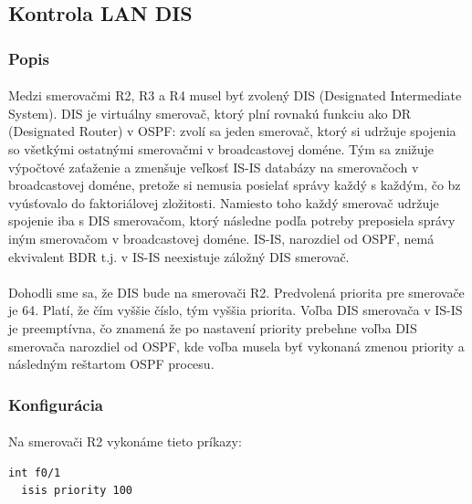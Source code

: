 \documentclass[12pt,twoside,a4paper]{report}
\begin{document}
\subsection{Kontrola LAN DIS}
\label{kontrola_lan_dis}
\subsubsection{Popis}
\paragraph{}
Medzi smerovačmi R2, R3 a R4 musel byť zvolený DIS (Designated Intermediate System). DIS je virtuálny smerovač, ktorý plní rovnakú funkciu ako DR (Designated Router) v OSPF: zvolí sa jeden smerovač, ktorý si udržuje spojenia so všetkými ostatnými smerovačmi v broadcastovej doméne. Tým sa znižuje výpočtové zaťaženie a zmenšuje veľkosť IS-IS databázy na smerovačoch v broadcastovej doméne, pretože si nemusia posielať správy každý s každým, čo bz vyúsťovalo do faktoriálovej zložitosti. Namiesto toho každý smerovač udržuje spojenie iba s DIS smerovačom, ktorý následne podľa potreby preposiela správy iným smerovačom v broadcastovej doméne. IS-IS, narozdiel od OSPF, nemá ekvivalent BDR t.j. v IS-IS neexistuje záložný DIS smerovač.

\paragraph{}
Dohodli sme sa, že DIS bude na smerovači R2. Predvolená priorita pre smerovače je 64. Platí, že čím vyššie číslo, tým vyššia priorita. Voľba DIS smerovača v IS-IS je preemptívna, čo znamená že  po nastavení priority prebehne voľba DIS smerovača narozdiel od OSPF, kde voľba musela byť vykonaná zmenou priority a následným reštartom OSPF procesu.

\subsubsection{Konfigurácia}
\paragraph{}
Na smerovači R2 vykonáme tieto príkazy:
\noindent
{\selectfont
\begin{small}
\begin{verbatim}
int f0/1
  isis priority 100
\end{verbatim}
\end{small}
}
\end{document}
